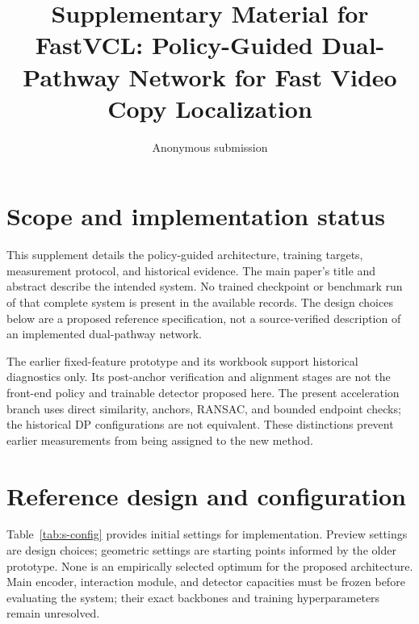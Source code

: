 \documentclass[10pt,twocolumn,letterpaper]{article}
\title{Supplementary Material for FastVCL: Policy-Guided Dual-Pathway Network for Fast Video Copy Localization}
\author{Anonymous submission}
\begin{document}
\maketitle

\section{Scope and implementation status}
This supplement details the policy-guided architecture, training targets, measurement protocol,
and historical evidence. The main paper's title and abstract describe the intended system.
No trained checkpoint or benchmark run of that complete system is present in the available
records. The design choices below are a proposed reference specification, not a source-verified
description of an implemented dual-pathway network.

The earlier fixed-feature prototype and its workbook support historical diagnostics only.
Its post-anchor verification and alignment stages are not the front-end policy and trainable
detector proposed here. The present acceleration branch uses direct similarity, anchors,
RANSAC, and bounded endpoint checks; the historical DP configurations are not equivalent.
These distinctions prevent earlier measurements from being assigned to the new method.

\section{Reference design and configuration}
\label{sec:s-config}
Table~\ref{tab:s-config} provides initial settings for implementation. Preview settings are
design choices; geometric settings are starting points informed by the older prototype.
None is an empirically selected optimum for the proposed architecture. Main encoder,
interaction module, and detector capacities must be frozen before evaluating the system;
their exact backbones and training hyperparameters remain unresolved.
\end{document}
